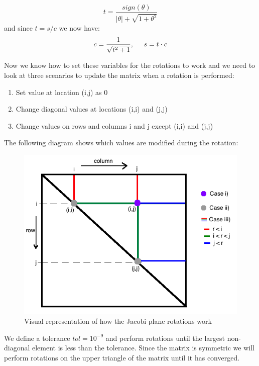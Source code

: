 \documentclass[12pt,twoside]{article}
\begin{document}
\begin{equation}
t =  \frac{sign(\theta)}{|\theta|+ \sqrt{1+\theta^2}}
\end{equation}
and since $t=s/c$ we now have:\\
\begin{equation}
c =  \frac{1}{\sqrt{t^2+1}}, \hspace{5mm} s = t\cdot c
\end{equation}


Now we know how to set these variables for the rotations to work and we need to look at three scenarios to update the matrix when a rotation is performed:

\begin{enumerate}[label=\roman*)]
  \item Set value at location (i,j) as 0
  \item Change diagonal values at locations (i,i) and (j,j)
  \item Change values on rows and columns i and j except (i,i) and (j,j)
\end{enumerate}

The following diagram shows which values are modified during the rotation:
\begin{figure}[H]
\begin{center}
\includegraphics[scale=0.5]{matrix.png}
\caption{Visual representation of how the Jacobi plane rotations work}
\end{center}
\end{figure}
We define a tolerance $tol=10^{-9}$ and perform rotations until the largest non-diagonal element is less than the tolerance. Since the matrix is symmetric we will perform rotations on the upper triangle of the matrix until it has converged.\\
\end{document}
